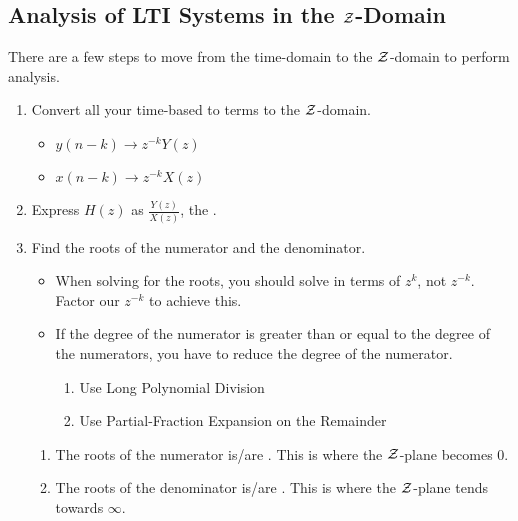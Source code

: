 \subsection{Analysis of LTI Systems in the \texorpdfstring{$\operatorname{\mathcal{Z}}$-Domain}{Z-Domain}}\label{subsec:Analysis LTI Systems Z-Domain}
There are a few steps to move from the time-domain to the $\operatorname{\mathcal{Z}}$-domain to perform analysis.
\begin{enumerate}[noitemsep]
\item Convert all your time-based to terms to the $\operatorname{\mathcal{Z}}$-domain.
  \begin{itemize}[noitemsep]
  \item $y(n-k) \rightarrow z^{-k}Y(z)$
  \item $x(n-k) \rightarrow z^{-k}X(z)$
  \end{itemize}
\item Express $H(z)$ as $\frac{Y(z)}{X(z)}$, the .
\item Find the roots of the numerator and the denominator.
  \begin{itemize}[noitemsep]
  \item When solving for the roots, you should solve in terms of $z^{k}$, not $z^{-k}$. Factor our $z^{-k}$ to achieve this.
  \item If the degree of the numerator is greater than or equal to the degree of the numerators, you have to reduce the degree of the numerator.
    \begin{enumerate}[noitemsep]
    \item Use Long Polynomial Division
    \item Use Partial-Fraction Expansion on the Remainder
    \end{enumerate}
  \end{itemize}
  \begin{enumerate}[noitemsep]
  \item The roots of the numerator is/are . This is where the $\operatorname{\mathcal{Z}}$-plane becomes 0.
  \item The roots of the denominator is/are . This is where the $\operatorname{\mathcal{Z}}$-plane tends towards $\infty$.
  \end{enumerate}
\end{enumerate}

